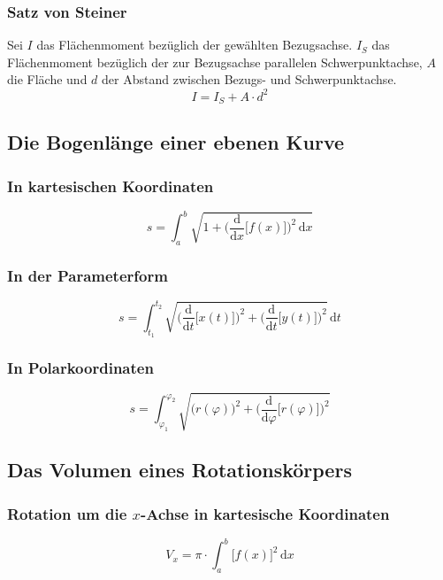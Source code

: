 \subsubsection{Satz von Steiner}
Sei $I$ das Flächenmoment bezüglich der gewählten Bezugsachse. $I_S$ das Flächenmoment bezüglich der zur Bezugsachse parallelen Schwerpunktachse, $A$ die Fläche und $d$ der Abstand zwischen Bezugs- und Schwerpunktachse.
\begin{equation} 
\boxed{I=I_S+A\cdot d^2}
\end{equation} 
\subsection{Die Bogenlänge einer ebenen Kurve}
\subsubsection{In kartesischen Koordinaten}
\begin{equation}
\boxed{s=\displaystyle \int_a^b\sqrt{1+\Big(\dfrac{\text{d}}{\text{d}x}\Big[f\left(x\right)\Big]\Big)^2\,\text{d}x}}
\end{equation}
\subsubsection{In der Parameterform}
\begin{equation}
\boxed{s=\displaystyle \int_{t_1}^{t_2}\sqrt{\Big(\dfrac{\text{d}}{\text{d}t}\Big[x\left(t\right)\Big]\Big)^2+\Big(\dfrac{\text{d}}{\text{d}t}\Big[y\left(t\right)\Big]\Big)^2}\,\text{d}t}
\end{equation}
\subsubsection{In Polarkoordinaten}
\begin{equation}
\boxed{s=\displaystyle \int_{\varphi_1}^{\varphi_2}\sqrt{\Big(r\left(\varphi\right)\Big)^2+\Big(\dfrac{\text{d}}{\text{d}\varphi}\Big[r\left(\varphi\right)\Big]\Big)^2}}
\end{equation}
\subsection{Das Volumen eines Rotationskörpers}
\subsubsection{Rotation um die $x$-Achse in kartesische Koordinaten}
\begin{equation}
\boxed{V_x=\pi\cdot \displaystyle \int_a^b\Big[f\left(x\right)\Big]^2\,\text{d}x}
\end{equation}
